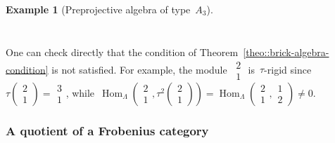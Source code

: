 \documentclass{amsart}
\theoremstyle{definition}
\newtheorem{example}[theorem]{Example}
\newcommand{\Hom}[1]{\operatorname{Hom}_{#1}}
\newcommand{\bsm}{\begin{smallmatrix}}
\newcommand{\esm}{\end{smallmatrix}}
\begin{document}
\begin{example}[Preprojective algebra of type~$A_3$]
\[{\begin{tikzcd}
  \end{tikzcd}
  }
 \]
 
One can check directly that the condition of Theorem~\ref{theo::brick-algebra-condition} is not satisfied.
For example, the module~$\bsm2\\1\esm$ is~$\tau$-rigid since~$\tau(\bsm2\\1\esm) = \bsm3\\1\esm$, while~$\Hom{\Lambda}\left(\bsm2\\1\esm,\tau^2(\bsm2\\1\esm)\right) = \Hom{\Lambda}(\bsm2\\1\esm,\bsm1\\2\esm) \neq 0$.
\end{example}


\subsubsection{A quotient of a Frobenius category}






\label{sec:biblio}
\end{document}
